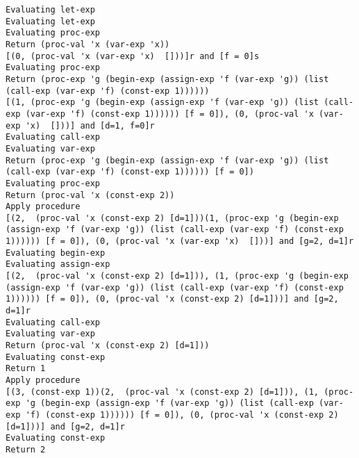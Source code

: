 \documentclass[../main.tex]{subfiles}
\begin{document}
\begin{lstlisting}
Evaluating let-exp
Evaluating let-exp
Evaluating proc-exp
Return (proc-val 'x (var-exp 'x))
[(0, (proc-val 'x (var-exp 'x)  []))]r and [f = 0]s
Evaluating proc-exp
Return (proc-exp 'g (begin-exp (assign-exp 'f (var-exp 'g)) (list (call-exp (var-exp 'f) (const-exp 1))))))
[(1, (proc-exp 'g (begin-exp (assign-exp 'f (var-exp 'g)) (list (call-exp (var-exp 'f) (const-exp 1)))))) [f = 0]), (0, (proc-val 'x (var-exp 'x)  []))] and [d=1, f=0]r
Evaluating call-exp
Evaluating var-exp
Return (proc-exp 'g (begin-exp (assign-exp 'f (var-exp 'g)) (list (call-exp (var-exp 'f) (const-exp 1)))))) [f = 0])
Evaluating proc-exp
Return (proc-val 'x (const-exp 2))
Apply procedure
[(2,  (proc-val 'x (const-exp 2) [d=1]))(1, (proc-exp 'g (begin-exp (assign-exp 'f (var-exp 'g)) (list (call-exp (var-exp 'f) (const-exp 1)))))) [f = 0]), (0, (proc-val 'x (var-exp 'x)  []))] and [g=2, d=1]r
Evaluating begin-exp
Evaluating assign-exp
[(2,  (proc-val 'x (const-exp 2) [d=1])), (1, (proc-exp 'g (begin-exp (assign-exp 'f (var-exp 'g)) (list (call-exp (var-exp 'f) (const-exp 1)))))) [f = 0]), (0, (proc-val 'x (const-exp 2) [d=1]))] and [g=2, d=1]r
Evaluating call-exp
Evaluating var-exp
Return (proc-val 'x (const-exp 2) [d=1]))
Evaluating const-exp
Return 1
Apply procedure
[(3, (const-exp 1))(2,  (proc-val 'x (const-exp 2) [d=1])), (1, (proc-exp 'g (begin-exp (assign-exp 'f (var-exp 'g)) (list (call-exp (var-exp 'f) (const-exp 1)))))) [f = 0]), (0, (proc-val 'x (const-exp 2) [d=1]))] and [g=2, d=1]r
Evaluating const-exp
Return 2
\end{lstlisting}
\end{document}
